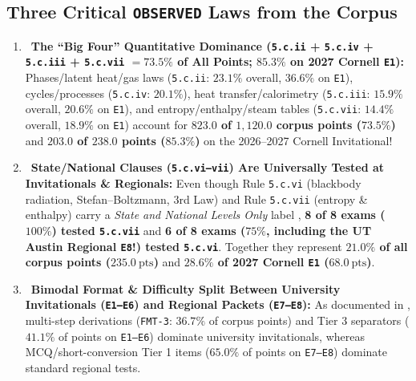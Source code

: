 \subsection{Three Critical \texttt{OBSERVED} Laws from the Corpus}
\begin{enumerate}
  \item \OBS\ \textbf{The ``Big Four'' Quantitative Dominance (\texttt{5.c.ii} + \texttt{5.c.iv} + \texttt{5.c.iii} + \texttt{5.c.vii} $= 73.5\%$ of All Points; $85.3\%$ on 2027 Cornell \texttt{E1}):} Phases/latent heat/gas laws (\texttt{5.c.ii}: $23.1\%$ overall, $36.6\%$ on \texttt{E1}), cycles/processes (\texttt{5.c.iv}: $20.1\%$), heat transfer/calorimetry (\texttt{5.c.iii}: $15.9\%$ overall, $20.6\%$ on \texttt{E1}), and entropy/enthalpy/steam tables (\texttt{5.c.vii}: $14.4\%$ overall, $18.9\%$ on \texttt{E1}) account for \textbf{$823.0$ of $1{,}120.0$ corpus points ($73.5\%$)} and \textbf{$203.0$ of $238.0$ points ($85.3\%$)} on the 2026--2027 Cornell Invitational!
  \item \OBS\ \textbf{State/National Clauses (\texttt{5.c.vi--vii}) Are Universally Tested at Invitationals \& Regionals:} Even though Rule \texttt{5.c.vi} (blackbody radiation, Stefan--Boltzmann, 3rd Law) and Rule \texttt{5.c.vii} (entropy \& enthalpy) carry a \textit{State and National Levels Only} label , \textbf{8 of 8 exams ($100\%$) tested \texttt{5.c.vii}} and \textbf{6 of 8 exams ($75\%$, including the UT Austin Regional \texttt{E8}!) tested \texttt{5.c.vi}}. Together they represent \textbf{$21.0\%$ of all corpus points ($\SI{235.0}{\text{pts}}$)} and \textbf{$28.6\%$ of 2027 Cornell \texttt{E1} ($\SI{68.0}{\text{pts}}$)}.
  \item \OBS\ \textbf{Bimodal Format \& Difficulty Split Between University Invitationals (\texttt{E1--E6}) and Regional Packets (\texttt{E7--E8}):} As documented in , multi-step derivations (\texttt{FMT-3}: $36.7\%$ of corpus points) and Tier 3 separators ($41.1\%$ of points on \texttt{E1--E6}) dominate university invitationals, whereas MCQ/short-conversion Tier 1 items ($65.0\%$ of points on \texttt{E7--E8}) dominate standard regional tests.
\end{enumerate}

